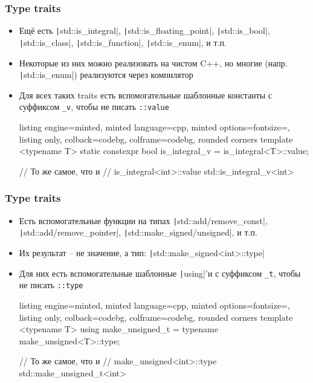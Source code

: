 \documentclass[10pt]{beamer}
\begin{document}
\begin{frame}[fragile]
\frametitle{Type traits}
\begin{itemize}
\item Ещё есть \texttt|std::is_integral|, \texttt|std::is_floating_point|, \texttt|std::is_bool|, \texttt|std::is_class|, \texttt|std::is_function|, \texttt|std::is_enum|, и т.п.
\pause
\item Некоторые из них можно реализовать на чистом C++, но многие (напр. \texttt|std::is_enum|) реализуются через компилятор
\pause
\item Для всех таких traits есть вспомогательные шаблонные константы с суффиксом \texttt{\_v}, чтобы не писать \texttt{::value}
\begin{tcblisting}{listing engine=minted, minted language=cpp, minted options={fontsize=\scriptsize}, listing only, colback=codebg, colframe=codebg, rounded corners}
template <typename T>
static constexpr bool is_integral_v = is_integral<T>::value;

// То же самое, что и
// is_integral<int>::value
std::is_integral_v<int>
\end{tcblisting}
\end{itemize}
\end{frame}

\begin{frame}[fragile]
\frametitle{Type traits}
\begin{itemize}
\item Есть вспомогательные функции на типах \texttt|std::add/remove_const|, \texttt|std::add/remove_pointer|, \texttt|std::make_signed/unsigned|, и т.п.
\pause
\item Их результат -- не значение, а тип: \texttt|std::make_signed<int>::type|
\pause
\item Для них есть вспомогательные шаблонные \texttt|using|'и с суффиксом \texttt{\_t}, чтобы не писать \texttt{::type}
\begin{tcblisting}{listing engine=minted, minted language=cpp, minted options={fontsize=\scriptsize}, listing only, colback=codebg, colframe=codebg, rounded corners}
template <typename T>
using make_unsigned_t = typename make_unsigned<T>::type;

// То же самое, что и
// make_unsigned<int>::type
std::make_unsigned_t<int>
\end{tcblisting}
\end{itemize}
\end{frame}
\end{document}
